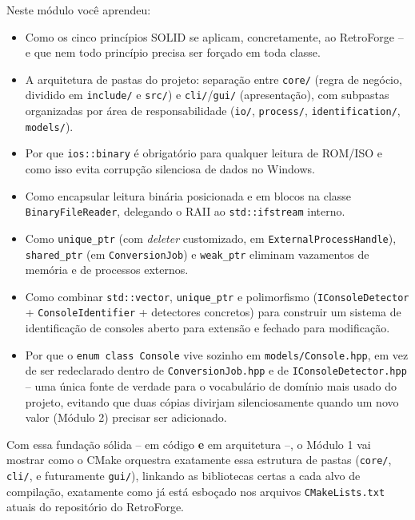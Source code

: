 \begin{CaixaResumo}
Neste módulo você aprendeu:
\begin{itemize}
    \item Como os cinco princípios SOLID se aplicam, concretamente, ao RetroForge -- e que nem todo princípio precisa ser forçado em toda classe.
    \item A arquitetura de pastas do projeto: separação entre \texttt{core/} (regra de negócio, dividido em \texttt{include/} e \texttt{src/}) e \texttt{cli/}/\texttt{gui/} (apresentação), com subpastas organizadas por área de responsabilidade (\texttt{io/}, \texttt{process/}, \texttt{identification/}, \texttt{models/}).
    \item Por que \texttt{ios::binary} é obrigatório para qualquer leitura de ROM/ISO e como isso evita corrupção silenciosa de dados no Windows.
    \item Como encapsular leitura binária posicionada e em blocos na classe \texttt{BinaryFileReader}, delegando o RAII ao \texttt{std::ifstream} interno.
    \item Como \texttt{unique\_ptr} (com \textit{deleter} customizado, em \texttt{ExternalProcessHandle}), \texttt{shared\_ptr} (em \texttt{ConversionJob}) e \texttt{weak\_ptr} eliminam vazamentos de memória e de processos externos.
    \item Como combinar \texttt{std::vector}, \texttt{unique\_ptr} e polimorfismo (\texttt{IConsoleDetector} + \texttt{ConsoleIdentifier} + detectores concretos) para construir um sistema de identificação de consoles aberto para extensão e fechado para modificação.
    \item Por que o \texttt{enum class Console} vive sozinho em \texttt{models/Console.hpp}, em vez de ser redeclarado dentro de \texttt{ConversionJob.hpp} e de \texttt{IConsoleDetector.hpp} -- uma única fonte de verdade para o vocabulário de domínio mais usado do projeto, evitando que duas cópias divirjam silenciosamente quando um novo valor (Módulo 2) precisar ser adicionado.
\end{itemize}

Com essa fundação sólida -- em código \textbf{e} em arquitetura --, o Módulo 1 vai mostrar como o CMake orquestra exatamente essa estrutura de pastas (\texttt{core/}, \texttt{cli/}, e futuramente \texttt{gui/}), linkando as bibliotecas certas a cada alvo de compilação, exatamente como já está esboçado nos arquivos \texttt{CMakeLists.txt} atuais do repositório do RetroForge.
\end{CaixaResumo}

